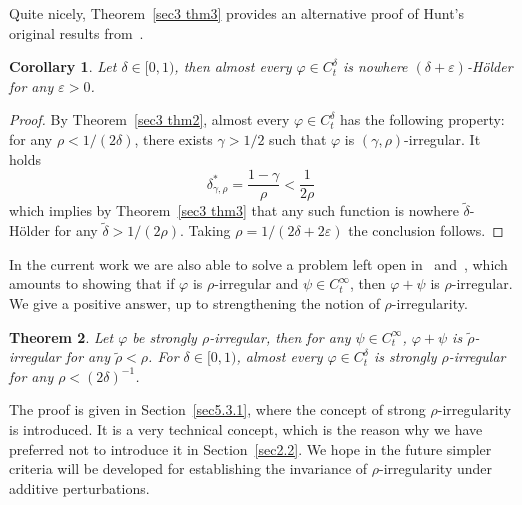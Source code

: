 \documentclass[10pt]{article}
\newtheorem{theorem}{Theorem}%
\newtheorem{corollary}[theorem]{Corollary}
\begin{document}
Quite nicely, Theorem~\ref{sec3 thm3} provides an alternative proof of Hunt's original
results from~{\cite{hunt}}.

\begin{corollary}
  \label{sec3 cor1}Let $\delta \in [0, 1)$, then almost every $\varphi \in
  C^{\delta}_t$ is nowhere $(\delta + \varepsilon)$\mbox{-}H\"{o}lder for any
  $\varepsilon > 0$.
\end{corollary}

\begin{proof}
  By Theorem~\ref{sec3 thm2}, almost every $\varphi \in C_t^{\delta}$ has the
  following property: for any $\rho < 1 / (2 \delta)$, there exists $\gamma >
  1 / 2$ such that $\varphi$ is $(\gamma, \rho)$\mbox{-}irregular. It holds
  \[ \delta^{\ast}_{\gamma, \rho} = \frac{1 - \gamma}{\rho} < \frac{1}{2 \rho}
  \]
  which implies by Theorem~\ref{sec3 thm3} that any such function is nowhere
  $\tilde{\delta}$\mbox{-}H\"{o}lder for any $\tilde{\delta} > 1 / (2 \rho)$.
  Taking $\rho = 1 / (2 \delta + 2 \varepsilon)$ the conclusion follows.
\end{proof}

In the current work we are also able to solve a problem left open
in~{\cite{catelliergubinelli}} and~{\cite{choukgubinelli1}}, which amounts to
showing that if $\varphi$ is $\rho$\mbox{-}irregular and $\psi \in
C^{\infty}_t$, then $\varphi + \psi$ is $\rho$\mbox{-}irregular. We give a
positive answer, up to strengthening the notion of $\rho$\mbox{-}irregularity.

\begin{theorem}
  \label{sec3 thm5}Let $\varphi$ be strongly $\rho$\mbox{-}irregular, then for
  any $\psi \in C^{\infty}_t$, $\varphi + \psi$ is
  $\tilde{\rho}$\mbox{-}irregular for any $\tilde{\rho} < \rho$. For $\delta
  \in [0, 1)$, almost every $\varphi \in C^{\delta}_t$ is strongly
  $\rho$\mbox{-}irregular for any $\rho < (2 \delta)^{- 1}$.
\end{theorem}

The proof is given in Section~\ref{sec5.3.1}, where the concept of strong
$\rho$\mbox{-}irregularity is introduced. It is a very technical concept,
which is the reason why we have preferred not to introduce it in
Section~\ref{sec2.2}. We hope in the future simpler criteria will be developed
for establishing the invariance of $\rho$\mbox{-}irregularity under additive
perturbations.
\end{document}
